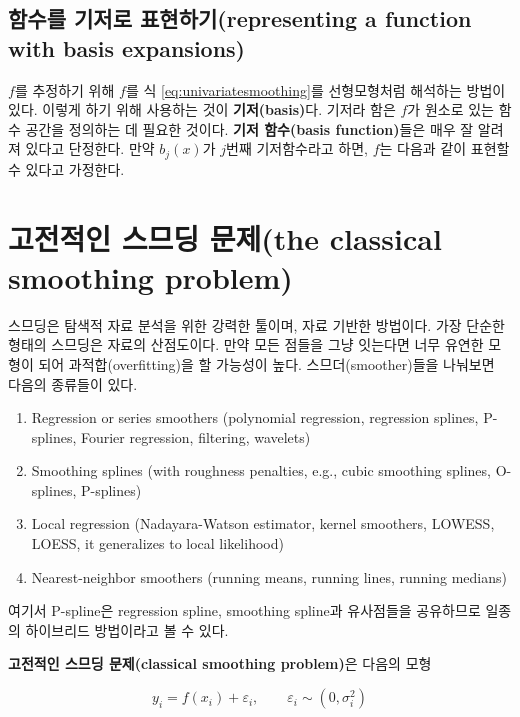 \documentclass[b5paper,]{scrbook}
\theoremstyle{plain}
\theoremstyle{definition}
\numberwithin{equation}{section}
\begin{document}
\hypertarget{--representing-a-function-with-basis-expansions}{%
\subsection{함수를 기저로 표현하기(representing a function with basis expansions)}\label{--representing-a-function-with-basis-expansions}}

\(f\)를 추정하기 위해 \(f\)를 식 \eqref{eq:univariatesmoothing}를 선형모형처럼 해석하는 방법이 있다. 이렇게 하기 위해 사용하는 것이 \textbf{기저(basis)}다. 기저라 함은 \(f\)가 원소로 있는 함수 공간을 정의하는 데 필요한 것이다. \textbf{기저 함수(basis function)}들은 매우 잘 알려져 있다고 단정한다. 만약 \(b_{j}(x)\)가 \(j\)번째 기저함수라고 하면, \(f\)는 다음과 같이 표현할 수 있다고 가정한다.

\hypertarget{--the-classical-smoothing-problem}{%
\section{고전적인 스므딩 문제(the classical smoothing problem)}\label{--the-classical-smoothing-problem}}

스므딩은 탐색적 자료 분석을 위한 강력한 툴이며, 자료 기반한 방법이다. 가장 단순한 형태의 스므딩은 자료의 산점도이다. 만약 모든 점들을 그냥 잇는다면 너무 유연한 모형이 되어 과적합(overfitting)을 할 가능성이 높다. 스므더(smoother)들을 나눠보면 다음의 종류들이 있다.

\begin{enumerate}
\def\labelenumi{\arabic{enumi}.}
\item
  Regression or series smoothers (polynomial regression, regression splines, P-splines, Fourier regression, filtering, wavelets)
\item
  Smoothing splines (with roughness penalties, e.g., cubic smoothing splines, O-splines, P-splines)
\item
  Local regression (Nadayara-Watson estimator, kernel smoothers, LOWESS, LOESS, it generalizes to local likelihood)
\item
  Nearest-neighbor smoothers (running means, running lines, running medians)
\end{enumerate}

여기서 P-spline은 regression spline, smoothing spline과 유사점들을 공유하므로 일종의 하이브리드 방법이라고 볼 수 있다.

\textbf{고전적인 스므딩 문제(classical smoothing problem)}은 다음의 모형

\begin{equation}
y_{i}=f(x_{i})+\varepsilon_{i}, \qquad{\varepsilon_{i}\sim(0,\sigma_{i}^{2})}
\label{eq:classicalsmoothingproblem}
\end{equation}
\end{document}

